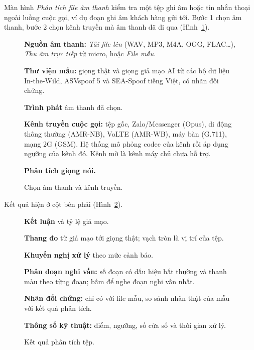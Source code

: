 \documentclass[11pt]{article}
\begin{document}
Màn hình \emph{Phân tích file âm thanh} kiểm tra một tệp ghi âm hoặc tin nhắn thoại ngoài luồng cuộc gọi, ví dụ đoạn ghi âm khách hàng gửi tới. Bước 1 chọn âm thanh, bước 2 chọn kênh truyền mà âm thanh đã đi qua (Hình~\ref{fig:checkin}).

\begin{figure}[tbp]
  \centering
  \caption{Chọn âm thanh và kênh truyền.}
  \label{fig:checkin}
  \begin{flushleft}\small
\begin{legend}
  \item \textbf{Nguồn âm thanh:} \emph{Tải file lên} (WAV, MP3, M4A, OGG, FLAC…), \emph{Thu âm trực tiếp} từ micro, hoặc \emph{File mẫu}.
  \item \textbf{Thư viện mẫu:} giọng thật và giọng giả mạo AI từ các bộ dữ liệu In-the-Wild, ASVspoof 5 và SEA-Spoof tiếng Việt, có nhãn đối chứng.
  \item \textbf{Trình phát} âm thanh đã chọn.
  \item \textbf{Kênh truyền cuộc gọi:} tệp gốc, Zalo/Messenger (Opus), di động thông thường (AMR-NB), VoLTE (AMR-WB), máy bàn (G.711), mạng 2G (GSM). Hệ thống mô phỏng codec của kênh rồi áp dụng ngưỡng của kênh đó. Kênh mờ là kênh máy chủ chưa hỗ trợ.
  \item \textbf{Phân tích giọng nói.}
\end{legend}
  \end{flushleft}
\end{figure}

Kết quả hiện ở cột bên phải (Hình~\ref{fig:checkres}).

\begin{figure}[tbp]
  \centering
  \caption{Kết quả phân tích tệp.}
  \label{fig:checkres}
  \begin{flushleft}\small
\begin{legend}
  \item \textbf{Kết luận} và tỷ lệ giả mạo.
  \item \textbf{Thang đo} từ giả mạo tới giọng thật; vạch tròn là vị trí của tệp.
  \item \textbf{Khuyến nghị xử lý} theo mức cảnh báo.
  \item \textbf{Phân đoạn nghi vấn:} số đoạn có dấu hiệu bất thường và thanh màu theo từng đoạn; bấm để nghe đoạn nghi vấn nhất.
  \item \textbf{Nhãn đối chứng:} chỉ có với file mẫu, so sánh nhãn thật của mẫu với kết quả phân tích.
  \item \textbf{Thông số kỹ thuật:} điểm, ngưỡng, số cửa sổ và thời gian xử lý.
\end{legend}
  \end{flushleft}
\end{figure}
\end{document}
